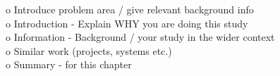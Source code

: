 o   Introduce problem area / give relevant background info
\\o   Introduction - Explain WHY you are doing this study
\\o   Information - Background / your study in the wider context
\\o   Similar work (projects, systems etc.)
\\o   Summary - for this chapter